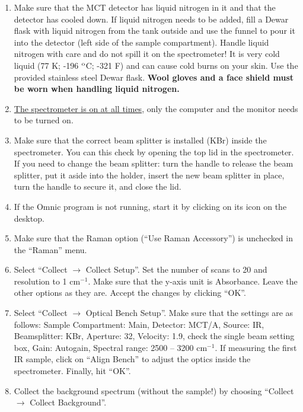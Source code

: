 \documentclass[byrevtex,amssymb,aps,pra,floatfix,letterpaper]{revtex4}
\begin{document}
\begin{enumerate}
\item Make sure that the MCT detector has liquid nitrogen in it and that the detector has cooled down. If liquid nitrogen needs to be added, fill a Dewar flask with liquid nitrogen from the tank outside and use the funnel to pour it into the detector (left side of the sample compartment). Handle liquid nitrogen with care and do not spill it on the spectrometer! It is very cold liquid (77 K; -196 $^\textnormal{o}$C; -321 F) and can cause cold burns on your skin. Use the provided stainless steel Dewar flask. \textbf{Wool gloves and a face shield must be worn when handling liquid nitrogen.}

\item \underline{The spectrometer is on at all times}, only the computer and the monitor needs to be turned on.

\item Make sure that the correct beam splitter is installed (KBr) inside the spectrometer. You can this check by opening the top lid in the spectrometer. If you need to change the beam splitter: turn the handle to release the beam splitter, put it aside into the holder, insert the new beam splitter in place, turn the handle to secure it, and close the lid.

\item If the Omnic program is not running, start it by clicking on its icon on the desktop.

\item Make sure that the Raman option (``Use Raman Accessory'') is unchecked in the ``Raman'' menu.

\item Select ``Collect $\rightarrow$ Collect Setup''. Set the number of scans to 20 and resolution to 1 cm$^{-1}$. Make sure that the y-axis unit is Absorbance. Leave the other options as they are. Accept the changes by clicking ``OK''.

\item Select ``Collect $\rightarrow$ Optical Bench Setup''. Make sure that the settings are as follows: Sample Compartment: Main, Detector: MCT/A, Source: IR, Beamsplitter: KBr, Aperture: 32, Velocity: 1.9, check the single beam setting box, Gain: Autogain, Spectral range: 2500 -- 3200 cm$^{-1}$. If measuring the first IR sample, click on ``Align Bench'' to adjust the optics inside the spectrometer. Finally, hit ``OK''.

\item Collect the background spectrum (without the sample!) by choosing ``Collect $\rightarrow$ Collect Background''.


\end{enumerate}
\end{document}
